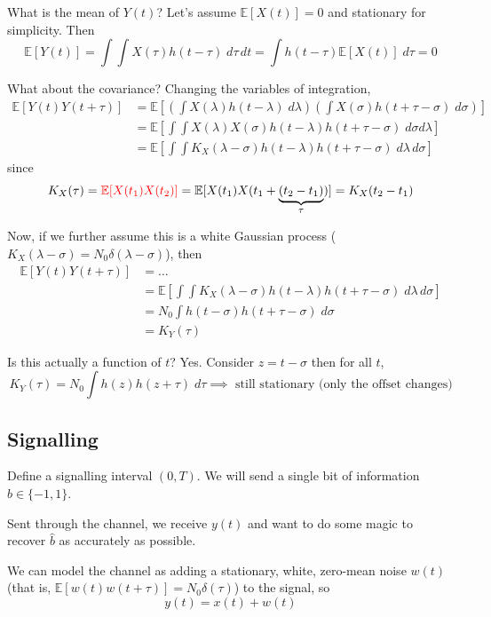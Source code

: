 \documentclass[12pt]{report}
\renewcommand{\hat}[1]{\widehat{#1}}
\newcommand{\E}{\mathbb{E}}
\begin{document}
What is the mean of $Y(t)$? Let's assume $\E[X(t)] = 0$ and stationary for simplicity. Then
\[\E[Y(t)] = \int \int X(\tau) h(t - \tau) \; d\tau \, dt = \int h(t - \tau) \E[X(t)] \; d\tau = 0\]

What about the covariance? Changing the variables of integration, 
\begin{align*}
    \E[Y(t) Y(t + \tau)] &= \E\left[\left(\int X(\lambda) h(t - \lambda)\; d\lambda\right)\left(\int X(\sigma) h(t + \tau - \sigma)\; d\sigma\right)\right]\\ 
    &= \E\left[\int \int X(\lambda) X(\sigma) h(t - \lambda) h(t + \tau - \sigma)\; d\sigma d\lambda\right]\\ 
    &= \E\left[\int \int K_X(\lambda - \sigma) h(t - \lambda) h(t + \tau - \sigma)\; d\lambda\, d\sigma\right]
\end{align*}
since
\[K_X(\tau) = \textcolor{red}{\E[X(t_1) X(t_2)]} = \E[X(t_1) X(t_1 + \underbrace{(t_2 - t_1)}_{\tau})] = K_X(t_2 - t_1)\] 

Now, if we further assume this is a white Gaussian process ($K_X(\lambda - \sigma) = N_0 \delta(\lambda - \sigma)$), then
\begin{align*}
    \E[Y(t) Y(t + \tau)] &= \dots\\ 
    &= \E\left[\int \int K_X(\lambda - \sigma) h(t - \lambda) h(t + \tau - \sigma)\; d\lambda\, d\sigma\right]\\ 
    &= N_0 \int h(t - \sigma) h(t + \tau - \sigma) \; d\sigma\\ 
    &= K_Y(\tau)
\end{align*}

Is this actually a function of $t$? Yes. Consider $z = t - \sigma$ then for all $t$, 
\[K_Y(\tau) = N_0 \int h(z) h(z + \tau)\; d\tau \implies \text{ still stationary (only the offset changes)}\]

\subsection{Signalling} 

Define a signalling interval $(0, T)$. We will send a single bit of information $b \in \{-1, 1\}$. 

Sent through the channel, we receive $y(t)$ and want to do some magic to recover $\hat b$ as accurately as possible.

We can model the channel as adding a stationary, white, zero-mean noise $w(t)$ (that is, $\E[w(t)w(t + \tau)] = N_0 \delta(\tau)$) to the signal, so
\[y(t) = x(t) + w(t)\]
\end{document}
